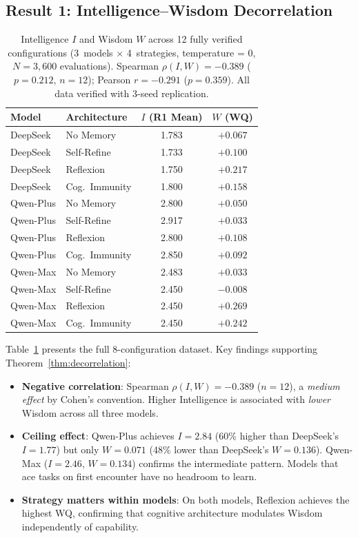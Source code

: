 \documentclass{article}
\begin{document}
\subsection{Result 1: Intelligence--Wisdom Decorrelation}

\begin{table}[t]
\centering
\caption{Intelligence $I$ and Wisdom $W$ across 12 fully verified configurations
(3~models $\times$ 4~strategies, temperature = 0, $N{=}3{,}600$ evaluations).
Spearman $\rho(I, W) = -0.389$ ($p = 0.212$, $n{=}12$); Pearson $r = -0.291$
($p = 0.359$). All data verified with 3-seed replication.}
\label{tab:iw_data}
\small
\begin{tabular}{llcc}
\toprule
\textbf{Model} & \textbf{Architecture} & $I$ (R1 Mean) & $W$ (WQ) \\
\midrule
DeepSeek & No Memory       & 1.783 & $+0.067$ \\
DeepSeek & Self-Refine     & 1.733 & $+0.100$ \\
DeepSeek & Reflexion       & 1.750 & $+0.217$ \\
DeepSeek & Cog.\ Immunity  & 1.800 & $+0.158$ \\
\midrule
Qwen-Plus & No Memory       & 2.800 & $+0.050$ \\
Qwen-Plus & Self-Refine     & 2.917 & $+0.033$ \\
Qwen-Plus & Reflexion       & 2.800 & $+0.108$ \\
Qwen-Plus & Cog.\ Immunity  & 2.850 & $+0.092$ \\
\midrule
Qwen-Max & No Memory       & 2.483 & $+0.033$ \\
Qwen-Max & Self-Refine     & 2.450 & $-0.008$ \\
Qwen-Max & Reflexion       & 2.450 & $+0.269$ \\
Qwen-Max & Cog.\ Immunity  & 2.450 & $+0.242$ \\
\bottomrule
\end{tabular}
\end{table}

Table~\ref{tab:iw_data} presents the full 8-configuration dataset.
Key findings supporting Theorem~\ref{thm:decorrelation}:

\begin{itemize}[leftmargin=*,itemsep=2pt]
    \item \textbf{Negative correlation}: Spearman $\rho(I, W) = -0.389$ ($n{=}12$), a \emph{medium effect} by Cohen's convention. Higher Intelligence is associated with \emph{lower} Wisdom across all three models.
    \item \textbf{Ceiling effect}: Qwen-Plus achieves $I{=}2.84$ (60\% higher than DeepSeek's $I{=}1.77$) but only $W{=}0.071$ (48\% lower than DeepSeek's $W{=}0.136$). Qwen-Max ($I{=}2.46$, $W{=}0.134$) confirms the intermediate pattern. Models that ace tasks on first encounter have no headroom to learn.
    \item \textbf{Strategy matters within models}: On both models, Reflexion achieves the highest WQ, confirming that cognitive architecture modulates Wisdom independently of capability.
\end{itemize}
\end{document}
